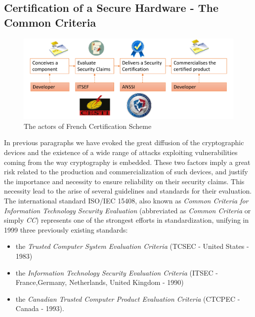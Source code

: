 \subsection{Certification of a Secure Hardware - The Common Criteria}
\begin{figure}
\includegraphics[width=\textwidth]{../Figures/ITSEF_ANSSI2.pdf} 
\caption{The actors of French Certification Scheme}
\end{figure}
In previous paragraphs we have evoked the great diffusion of the cryptographic devices and the existence of a wide range of attacks exploiting vulnerabilities coming from the way cryptography is embedded. These two factors imply a great risk related to the production and commercialization of such devices, and justify the importance and necessity to ensure reliability on their security claims. This necessity lead to the arise of several guidelines and standards for their evaluation. The international standard ISO/IEC 15408, also known as \emph{Common Criteria for Information Technology Security Evaluation} (abbreviated as \emph{Common Criteria} or simply \emph{CC}) represents one of the strongest efforts in standardization, unifying in 1999 three previously existing standards:
\begin{itemize}
\item the \emph{Trusted Computer System Evaluation Criteria} (TCSEC - United States - 1983)
\item the \emph{Information Technology Security Evaluation Criteria} (ITSEC - France,Germany, Netherlands, United Kingdom - 1990)
\item the \emph{Canadian Trusted Computer Product Evaluation Criteria} (CTCPEC - Canada - 1993).
\end{itemize}

